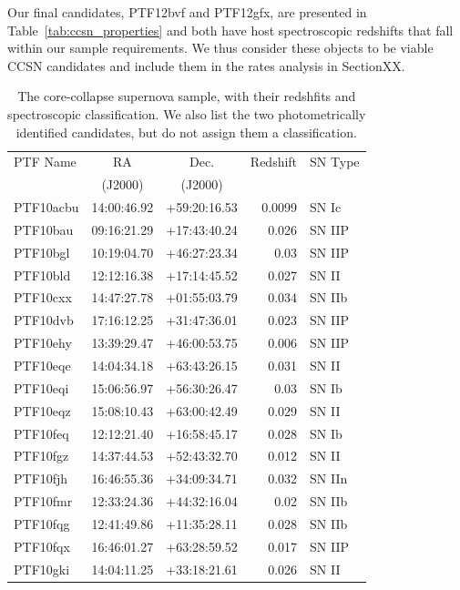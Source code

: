 \documentclass[a4paper,fleqn,usenatbib]{mnras}
\begin{document}
Our final candidates, PTF12bvf and PTF12gfx, are presented in Table~\ref{tab:ccsn_properties} and both have host spectroscopic redshifts that fall within our sample requirements. We thus consider these objects to be viable CCSN candidates and include them in the rates analysis in SectionXX.

\begin{table}
    \caption{The core-collapse supernova sample, with their redshfits and spectroscopic classification. We also list the two photometrically identified candidates, but do not assign them a classification.}
    \begin{center}
    \begin{tabular}{lccrl}
        \hline
    PTF Name & RA & Dec. & Redshift & SN Type \\
             & (J2000) & (J2000) & & \\
        \hline
    PTF10acbu & 14:00:46.92 & +59:20:16.53 & 0.0099 & SN Ic \\
    PTF10bau & 09:16:21.29 & +17:43:40.24 & 0.026 & SN IIP \\
    PTF10bgl & 10:19:04.70 & +46:27:23.34 & 0.03 & SN IIP \\
    PTF10bld & 12:12:16.38 & +17:14:45.52 & 0.027 & SN II \\
    PTF10cxx & 14:47:27.78 & +01:55:03.79 & 0.034 & SN IIb \\
    PTF10dvb & 17:16:12.25 & +31:47:36.01 & 0.023 & SN IIP \\
    PTF10ehy & 13:39:29.47 & +46:00:53.75 & 0.006 & SN IIP \\
    PTF10eqe & 14:04:34.18 & +63:43:26.15 & 0.031 & SN II \\
    PTF10eqi & 15:06:56.97 & +56:30:26.47 & 0.03 & SN Ib \\
    PTF10eqz & 15:08:10.43 & +63:00:42.49 & 0.029 & SN II \\
    PTF10feq & 12:12:21.40 & +16:58:45.17 & 0.028 & SN Ib \\
    PTF10fgz & 14:37:44.53 & +52:43:32.70 & 0.012 & SN II \\
    PTF10fjh & 16:46:55.36 & +34:09:34.71 & 0.032 & SN IIn \\
    PTF10fmr & 12:33:24.36 & +44:32:16.04 & 0.02 & SN IIb \\
    PTF10fqg & 12:41:49.86 & +11:35:28.11 & 0.028 & SN IIb \\
    PTF10fqx & 16:46:01.27 & +63:28:59.52 & 0.017 & SN IIP \\
    PTF10gki & 14:04:11.25 & +33:18:21.61 & 0.026 & SN II \\

\end{tabular}
\end{center}
\end{table}
\end{document}
